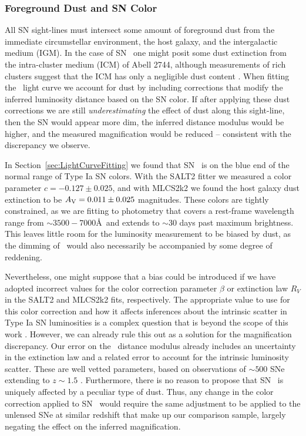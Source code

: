 \subsubsection{Foreground Dust and SN Color}
\label{sec:ForegroundDust}

All SN sight-lines must intersect some amount of foreground dust from
the immediate circumstellar environment, the host galaxy, and the
intergalactic medium (IGM). In the case of SN \tomas\ one might posit
some dust extinction from the intra-cluster medium (ICM) of Abell
2744, although measurements of rich clusters suggest that the ICM has
only a negligible dust
content \citep{Maoz:1995,Stickel:2002,Bai:2007}.  When fitting
the \tomas\ light curve we account for dust by including corrections
that modify the inferred luminosity distance based on the SN color.
If after applying these dust corrections we are still {\it
underestimating} the effect of dust along this sight-line, then the SN
would appear more dim, the inferred distance modulus would be higher,
and the measured magnification would be reduced -- consistent with the
discrepancy we observe.

In Section~\ref{sec:LightCurveFitting} we found that SN \tomas\ is on
the blue end of the normal range of Type Ia SN colors.  With the SALT2
fitter we measured a color parameter $c=-0.127\pm0.025$, and with
MLCS2k2 we found the host galaxy dust extinction to be $A_{\rm
V}=0.011\pm0.025$ magnitudes.  These colors are tightly constrained,
as we are fitting to photometry that covers a rest-frame wavelength
range from $\sim3500-7000$\AA\ and extends to $\sim$30 days past
maximum brightness.  This leaves little room for the luminosity
measurement to be biased by dust, as the dimming of \tomas\ would also
necessarily be accompanied by some degree of reddening. 

Nevertheless, one might suppose that a bias could be introduced if we
have adopted incorrect values for the color correction parameter
$\beta$ or extinction law $R_V$ in the SALT2 and MLCS2k2 fits,
respectively.  The appropriate value to use for this color correction
and how it affects inferences about the intrinsic scatter in Type Ia
SN luminosities is a complex question that is beyond the scope of this
work \citep[see
e.g.][]{Marriner:2011,Chotard:2011,Kessler:2013,Scolnic:2014a}.
However, we can already rule this out as a solution for the
magnification discrepancy.  Our error on the \tomas\ distance modulus
already includes an uncertainty in the extinction law and a related
error to account for the intrinsic luminosity scatter. These are well
vetted parameters, based on observations of $\sim500$ SNe extending
to $z\sim1.5$ \citep{Sullivan:2011}.  Furthermore, there is no reason
to propose that SN \tomas\ is uniquely affected by a peculiar type of
dust.  Thus, any change in the color correction applied to SN \tomas\
would require the same adjustment to be applied to the unlensed SNe at
similar redshift that make up our comparison sample, largely negating
the effect on the inferred magnification. 

